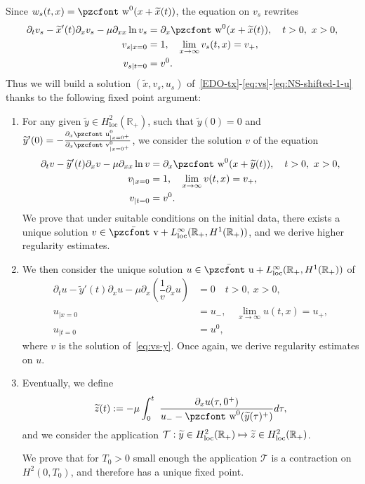 \documentclass[10pt]{amsart}
\theoremstyle{definition}\newtheorem{defi}[theo]{Definition}\newtheorem{rema}[theo]{Remark}\newtheorem{exam}[theo]{Example}\newtheorem{exem}[theo]{Example}\newtheorem{nota}[theo]{Notation}
\newcommand{\mathpzc}[1]{\text{\pzcfont #1}}
\newcommand{\R}{\mathbb{R}}
\newcommand{\p}{\partial}
\newcommand{\bv}{\bar{\mathpzc{v}}}
\newcommand{\bu}{\bar{\mathpzc{u}}}
\newcommand{\cT}{\mathcal T}
\newcommand{\rloc}{\mathrm{loc}}
\newcommand{\tv}{\mathpzc{v}}
\newcommand{\tu}{\mathpzc{u}}
\newcommand{\tw}{\mathpzc{w}}
\newcommand{\tx}{\widetilde{x}}
\newcommand{\ty}{\widetilde{y}}
\let\oldtilde\tilde
\renewcommand*{\tilde}[1]{\mathchoice{\widetilde{#1}}{\widetilde{#1}}{\oldtilde{#1}}{\oldtilde{#1}}}
\begin{document}
Since $w_s(t,x)=\tw^0(x + \tx(t))$, the equation on $v_s$ rewrites
\begin{equation}\label{eq:vs}
\begin{aligned}
\p_t v_s - \tx'(t) \p_x v_s - \mu \p_{x x} \ln v_s &= \p_x \tw^0(x+ \tx(t)),\quad t>0, \ x>0,\\
v_{s|x=0} &=1,\quad \lim_{x\to \infty} v_s(t,x)= v_+,\\
v_{s|t=0} &=v^0.
\end{aligned}
\end{equation}
Thus we will build a solution $(\tx, v_s, u_s)$ of~\eqref{EDO-tx}-\eqref{eq:vs}-\eqref{eq:NS-shifted-1-u} thanks to the following fixed point argument:
\begin{enumerate}
\item For any given $\ty\in H^2_\rloc(\R_+)$, such that $\ty(0) = 0$ and $\ty'(0)= - \frac{\p_x \tu^0_{|x=0^+}}{\partial_x \tv^0_{|x=0^+}}$, we consider the solution $v$ of the equation
\begin{equation}\label{eq:vs-y}
\begin{aligned}
\p_t v - \ty'(t) \p_x v - \mu \p_{x x} \ln v &= \p_x \tw^0(x+ \ty(t)),\quad t>0, \ x>0,\\
v_{|x=0} &=1,\quad \lim_{x\to \infty} v(t,x)= v_+,\\
v_{|t=0} &=v^0.
\end{aligned}
\end{equation}
We prove that under suitable conditions on the initial data, there exists a unique solution $v \in \bv + L^\infty_\rloc(\R_+,H^1(\R_+))$, and we derive higher regularity estimates.
\item We then consider the unique solution $u\in \bu + L^\infty_\rloc(\R_+, H^1(\R_+))$ of
\begin{equation}\label{eq:us-y}
\begin{aligned}
\partial_t u - \ty'(t) \p_x u - \mu \partial_x\left(\dfrac{1}{v}\partial_x u\right) &= 0\quad t>0, \ x>0,\\
u_{|x=0} &= u_-, \quad \lim_{x\to \infty} u(t,x)= u_+,\\
u_{|t=0} &=u^0,
\end{aligned}
\end{equation}
where $v$ is the solution of~\eqref{eq:vs-y}. Once again, we derive regularity estimates on $u$.

\item Eventually, we define
\[
\tilde z(t):=-\mu \int_0^t \ \frac{ \p_x u(\tau, 0^+)}{u_- - \tw^0(\tilde y(\tau)^+)}d\tau,
\]
and we consider the application $\cT:\tilde y \in H^2_\rloc(\R_+) \mapsto \tilde z \in H^2_\rloc(\R_+)$.

\noindent We prove that for $T_0>0$ small enough the application $\cT$ is a contraction on $H^2(0, T_0)$, and therefore has a unique fixed point.
\end{enumerate}
\end{document}
